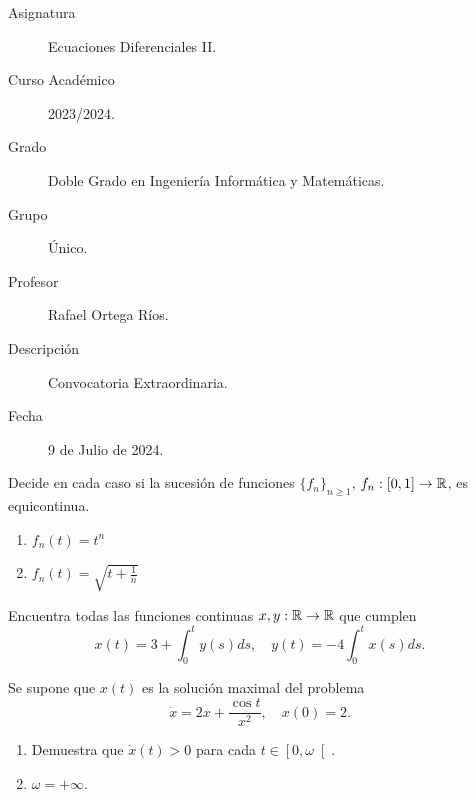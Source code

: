 \documentclass[12pt]{article}
\begin{document}

    
    

    \begin{description}
        \item[Asignatura] Ecuaciones Diferenciales II.
        \item[Curso Académico] 2023/2024.
        \item[Grado] Doble Grado en Ingeniería Informática y Matemáticas.
        \item[Grupo] Único.
        \item[Profesor] Rafael Ortega Ríos.
        \item[Descripción] Convocatoria Extraordinaria.
        \item[Fecha] 9 de Julio de 2024.
    
    \end{description}
    \newpage


    
    \begin{ejercicio}
        Decide en cada caso si la sucesión de funciones $\{f_n\}_{n \geq 1}$, $f_n : \left[0, 1\right] \to \mathbb{R}$, es equicontinua.
        \begin{enumerate}[label=\alph*)]
            \item $f_n(t) = t^n$
            \item $f_n(t) = \sqrt{t + \frac{1}{n}}$
        \end{enumerate}
    \end{ejercicio}

    \begin{ejercicio}
        Encuentra todas las funciones continuas $x, y : \mathbb{R} \to \mathbb{R}$ que cumplen
        \[
            x(t) = 3 + \int_{0}^{t} y(s)ds, \quad y(t) = -4 \int_{0}^{t} x(s)ds.
        \]
    \end{ejercicio}

    \begin{ejercicio}
        Se supone que $x(t)$ es la solución maximal del problema
        \[
            \dot{x} = 2x + \frac{\cos t}{x^2}, \quad x(0) = 2.
        \]
        \begin{enumerate}[label=\alph*)]
            \item Demuestra que $\dot{x}(t) > 0$ para cada $t \in \left[0, \omega\right[$.
            \item $\omega = +\infty$.
        \end{enumerate}
    \end{ejercicio}
\end{document}
